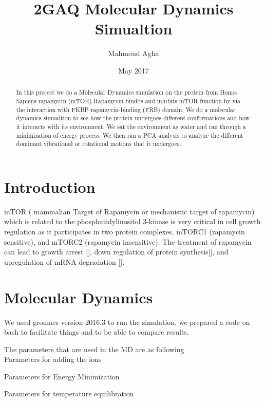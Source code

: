 \documentclass{article}
\title{2GAQ Molecular Dynamics Simualtion}
\author{Mahmoud Agha}
\date{May 2017}
\begin{document}
\maketitle
\begin{abstract}
    In this project we do a Molecular Dynamics simulation on the protein from Homo-Sapiens rapamycin (mTOR).Rapamycin bindds and inhibits mTOR function by via the interaction with FKBP-rapamycin-binding (FRB) domain. We do a molecular dynamics simualtion to see how the protein undergoes different conformations and how it interacts with its environment. We sat the environment as water and ran through a minimization of energy process. We then ran a PCA analysis to analyze the different dominant vibrational or rotational motions that it undergoes.
\end{abstract}

\section{Introduction}
mTOR ( mammalian Target of Rapamycin or mechanistic target of rapamycin) which is related to the phosphatidylinositol 3-kinase is very critical in cell growth regulation as it participates in two protein complexes, mTORC1 (rapamycin sensitive), and mTORC2 (rapamycin insensitive). The treatment of rapamycin can lead to growth arrest [], down regulation of protein synthesis[], and upregulation of mRNA degradation [].

\section{Molecular Dynamics}
We used gromacs version 2016.3 to run the simulation, we prepared a code on bash to facilitate things and to be able to compare results.




The parameters that are used in the MD are as following \\
Parameters for adding the ions

 
 Parameters for Energy Minimization
 
 
 Parameters for temperature equilibration
 
 
\end{document}
